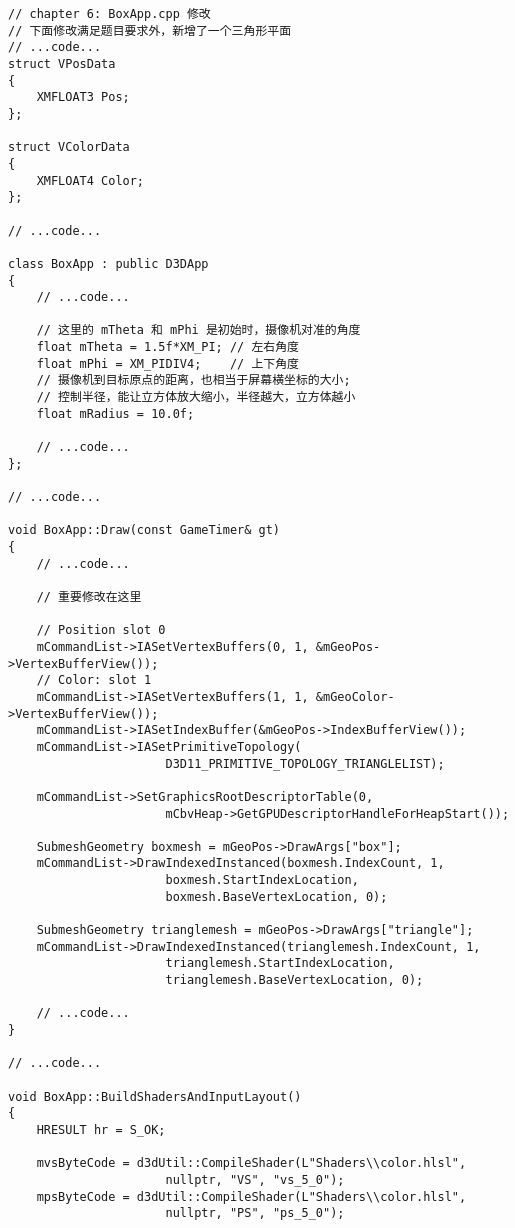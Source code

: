 \begin{lstlisting}
// chapter 6: BoxApp.cpp 修改
// 下面修改满足题目要求外，新增了一个三角形平面
// ...code...
struct VPosData
{
    XMFLOAT3 Pos;
};

struct VColorData
{
    XMFLOAT4 Color;
};

// ...code...

class BoxApp : public D3DApp
{
    // ...code...

    // 这里的 mTheta 和 mPhi 是初始时，摄像机对准的角度
    float mTheta = 1.5f*XM_PI; // 左右角度
    float mPhi = XM_PIDIV4;    // 上下角度
    // 摄像机到目标原点的距离，也相当于屏幕横坐标的大小;
    // 控制半径，能让立方体放大缩小，半径越大，立方体越小
    float mRadius = 10.0f;

    // ...code...
};

// ...code...

void BoxApp::Draw(const GameTimer& gt)
{
    // ...code...
    
    // 重要修改在这里

    // Position slot 0
    mCommandList->IASetVertexBuffers(0, 1, &mGeoPos->VertexBufferView());
    // Color: slot 1
    mCommandList->IASetVertexBuffers(1, 1, &mGeoColor->VertexBufferView());
    mCommandList->IASetIndexBuffer(&mGeoPos->IndexBufferView());
    mCommandList->IASetPrimitiveTopology(
                      D3D11_PRIMITIVE_TOPOLOGY_TRIANGLELIST);

    mCommandList->SetGraphicsRootDescriptorTable(0, 
                      mCbvHeap->GetGPUDescriptorHandleForHeapStart());

    SubmeshGeometry boxmesh = mGeoPos->DrawArgs["box"];
    mCommandList->DrawIndexedInstanced(boxmesh.IndexCount, 1,
                      boxmesh.StartIndexLocation, 
                      boxmesh.BaseVertexLocation, 0);

    SubmeshGeometry trianglemesh = mGeoPos->DrawArgs["triangle"];
    mCommandList->DrawIndexedInstanced(trianglemesh.IndexCount, 1, 
                      trianglemesh.StartIndexLocation, 
                      trianglemesh.BaseVertexLocation, 0);

    // ...code...
}

// ...code...

void BoxApp::BuildShadersAndInputLayout()
{
    HRESULT hr = S_OK;

    mvsByteCode = d3dUtil::CompileShader(L"Shaders\\color.hlsl", 
                      nullptr, "VS", "vs_5_0");
    mpsByteCode = d3dUtil::CompileShader(L"Shaders\\color.hlsl", 
                      nullptr, "PS", "ps_5_0");


\end{lstlisting}
